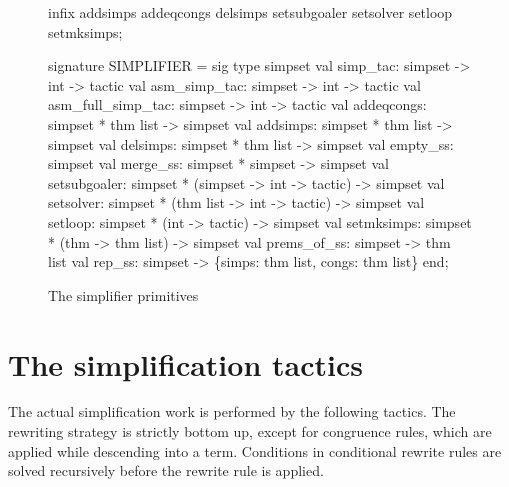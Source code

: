 \begin{figure}
\begin{ttbox}
infix addsimps addeqcongs delsimps
      setsubgoaler setsolver setloop setmksimps;

signature SIMPLIFIER =
sig
  type simpset
  val simp_tac:          simpset -> int -> tactic
  val asm_simp_tac:      simpset -> int -> tactic
  val asm_full_simp_tac: simpset -> int -> tactic\smallskip
  val addeqcongs:   simpset * thm list -> simpset
  val addsimps:     simpset * thm list -> simpset
  val delsimps:     simpset * thm list -> simpset
  val empty_ss:     simpset
  val merge_ss:     simpset * simpset -> simpset
  val setsubgoaler: simpset * (simpset -> int -> tactic) -> simpset
  val setsolver:    simpset * (thm list -> int -> tactic) -> simpset
  val setloop:      simpset * (int -> tactic) -> simpset
  val setmksimps:   simpset * (thm -> thm list) -> simpset
  val prems_of_ss:  simpset -> thm list
  val rep_ss:       simpset -> \{simps: thm list, congs: thm list\}
end;
\end{ttbox}
\caption{The simplifier primitives} \label{SIMPLIFIER}
\end{figure}


\section{The simplification tactics} \label{simp-tactics}

The actual simplification work is performed by the following tactics.  The
rewriting strategy is strictly bottom up, except for congruence rules, which
are applied while descending into a term.  Conditions in conditional rewrite
rules are solved recursively before the rewrite rule is applied.

